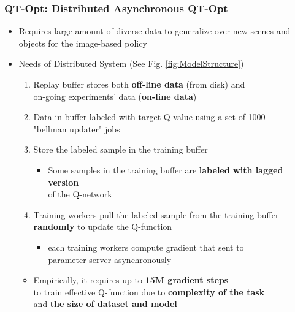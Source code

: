 \documentclass{beamer}
\newcommand{\forthSec}{QT-Opt}
\begin{document}
    \begin{frame}
      \frametitle{\forthSec : Distributed Asynchronous QT-Opt}
      \begin{itemize}
        \item Requires large amount of diverse data to generalize over new scenes and objects for the image-based policy
        \linebreak
        \item Needs of Distributed System (See Fig. \ref{fig:ModelStructure})
        \begin{enumerate}
          \item Replay buffer stores both \textbf{off-line data} (from disk) and \\ 
                on-going experiments' data (\textbf{on-line data})
          \item Data in buffer labeled with target Q-value using a set of 1000 \\
                "bellman updater" jobs
          \item Store the labeled sample in the training buffer
          \begin{itemize}
            \item Some samples in the training buffer are \textbf{labeled with lagged version} \\ 
                  of the Q-network
          \end{itemize}
          \item Training workers pull the labeled sample from the training buffer \textbf{randomly} to update the Q-function
          \begin{itemize}
            \item each training workers compute gradient that sent to \\ 
                  parameter server asynchronously
          \end{itemize}
        \end{enumerate}
        \begin{itemize}
          \item Empirically, it requires up to \textbf{15M gradient steps} \\
                to train effective Q-function due to \textbf{complexity of the task} \\ 
                and \textbf{the size of dataset and model}
        \end{itemize}
      \end{itemize}
    \end{frame}
\end{document}
